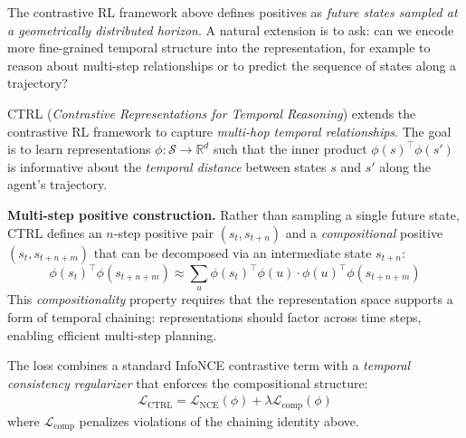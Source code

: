 \documentclass[11pt, letterpaper]{article}
\begin{document}
The contrastive RL framework above defines positives as \textit{future states sampled at a geometrically distributed horizon}. A natural extension is to ask: can we encode more fine-grained temporal structure into the representation, for example to reason about multi-step relationships or to predict the sequence of states along a trajectory?
 
\begin{concept}
    CTRL (\textit{Contrastive Representations for Temporal Reasoning}) extends the contrastive RL framework to capture \textit{multi-hop temporal relationships}. The goal is to learn representations \(\phi : \mathcal{S} \to \mathbb{R}^d\) such that the inner product \(\phi(s)^\top \phi(s')\) is informative about the \textit{temporal distance} between states \(s\) and \(s'\) along the agent's trajectory.
 
    \textbf{Multi-step positive construction.} Rather than sampling a single future state, CTRL defines an \(n\)-step positive pair \((s_t, s_{t+n})\) and a \textit{compositional} positive \((s_t, s_{t+n+m})\) that can be decomposed via an intermediate state \(s_{t+n}\):
    \[
        \phi(s_t)^\top \phi(s_{t+n+m}) \approx \sum_u \phi(s_t)^\top \phi(u) \cdot \phi(u)^\top \phi(s_{t+n+m})
    \]
    This \textit{compositionality} property requires that the representation space supports a form of temporal chaining: representations should factor across time steps, enabling efficient multi-step planning.
 
    The loss combines a standard InfoNCE contrastive term with a \textit{temporal consistency regularizer} that enforces the compositional structure:
    \begin{align*}
        \mathcal{L}_{\text{CTRL}} = \mathcal{L}_{\text{NCE}}(\phi) + \lambda \mathcal{L}_{\text{comp}}(\phi)
    \end{align*}
    where \(\mathcal{L}_{\text{comp}}\) penalizes violations of the chaining identity above.
\end{concept}
 
\end{document}
